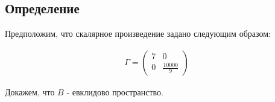 \subsection*{Определение}
Предположим, что скалярное произведение задано следующим образом:

\newcommand{\mtxa}{{7}}
\newcommand{\mtxb}{{\frac{10000}{9}}}
\newcommand{\mtx}{{\begin{pmatrix} \mtxa & 0 \\ 0 & \mtxb \end{pmatrix}}}

\begin{align*}
  \Gamma = \mtx
\end{align*}

Докажем, что $B$ - евклидово пространство.
